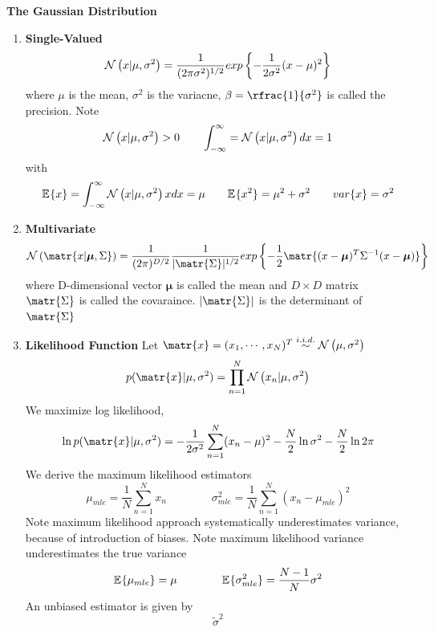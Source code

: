 \documentclass[11pt]{article}
\begin{document}
\begin{defn*}
    \textbf{The Gaussian Distribution}
    \begin{enumerate}
        \item \textbf{Single-Valued}
        \[
            \mathcal{N}\left(x|\mu, \sigma^2\right)
            = 
            \frac{1}{(2\pi \sigma^2)^{1/2}}
            exp\left\{-\frac{1}{2\sigma^2}(x-\mu)^2\right\}
        \]
        where $\mu$ is the mean, $\sigma^2$ is the variacne, $\beta = \rfrac{1}{\sigma^2}$ is called the precision. Note
        \[
            \mathcal{N}\left(x|\mu, \sigma^2\right) > 0
            \quad \quad 
            \int_{-\infty}^{\infty} = \mathcal{N}\left(x|\mu, \sigma^2\right) dx = 1
        \]
        with 
        \[
            \mathbb{E}_{}\{x\} = \int_{-\infty}^{\infty} \mathcal{N}\left(x|\mu, \sigma^2\right) x dx = \mu
            \quad \quad 
            \mathbb{E}_{}\{x^2\} = \mu^2 + \sigma^2 
            \quad \quad 
            var\{x\} = \sigma^2
        \]
        \item \textbf{Multivariate}
        \[
            \normal{\matr{x|\boldsymbol{\mu}, \Sigma}}
            = 
            \frac{1}{(2\pi)^{D/2}}
            \frac{1}{|\matr{\Sigma}|^{1/2}}  
            \exponents{-\frac{1}{2} 
                \matr{(x-\bmu)^T \Sigma^{-1} (x-\bmu)}
            }
        \]
        where D-dimensional vector $\boldsymbol{\mu}$ is called the mean and $D\times D$ matrix $\matr{\Sigma}$ is called the covaraince. $|\matr{\Sigma}|$ is the determinant of $\matr{\Sigma}$
        \item \textbf{Likelihood Function} Let $\matr{x} = (x_1, \cdots, x_N)^T \overset{i.i.d.}{\sim} \normal{\mu, \sigma^2}$ 
        \[
            p(\matr{x}|\mu, \sigma^2) = 
            \prod_{n=1}^N \normal{x_n | \mu, \sigma^2}    
        \]
        We maximize log likelihood,
        \[
            \ln{p(\matr{x}|\mu, \sigma^2)} = 
            - \frac{1}{2\sigma^2} \sum_{n=1}^N (x_n - \mu)^2 - \frac{N}{2} \ln{\sigma^2} - \frac{N}{2}\ln{2\pi}
        \]
        We derive the maximum likelihood estimators 
        \[
            \mu_{mle} = \frac{1}{N} \sum_{n=1}^N x_n 
            \quad \quad \quad \quad 
            \sigma^2_{mle} = \frac{1}{N}\sum_{n=1}^N (x_n - \mu_{mle})^2
        \]
        Note maximum likelihood approach systematically underestimates variance, because of introduction of biases. Note maximum likelihood variance underestimates the true variance 
        \[
            \mathbb{E}_{}\{\mu_{mle}\} = \mu 
            \quad \quad \quad \quad 
            \mathbb{E}_{}\{\sigma^2_{mle}\} = \frac{N-1}{N} \sigma^2
        \]
        An unbiased estimator is given by 
        \[
            \widetilde{\sigma}^2
\]
\end{enumerate}
\end{defn*}
\end{document}
